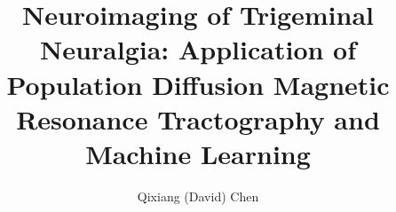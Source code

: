 \documentclass[12pt,oneandahalfspaced, twoside]{ut-thesis}
\begin{document}
\nobibliography*

\begin{preliminary}
    

\author{Qixiang (David) Chen}
\title{Neuroimaging of Trigeminal Neuralgia: Application of Population Diffusion Magnetic Resonance Tractography and Machine Learning}

\maketitle





\renewcommand{\contentsname}{Table of Contents}
\tableofcontents

\printglossary[type=\acronymtype, nonumberlist, title={List of Abbreviations}]
\cleardoublepage
{}
\listoffigures
\cleardoublepage
{}
\listoftables
\cleardoublepage

\end{preliminary}

\setlength{\parskip}{12pt}














\begin{appendices}
    
\end{appendices}
\end{document}
